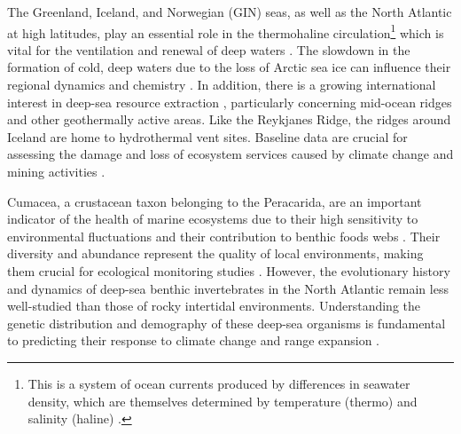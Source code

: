 The Greenland, Iceland, and Norwegian (GIN) seas, as well as the North Atlantic at high latitudes, play an essential role in the {thermohaline circulation}\footnote{This is a system of ocean currents produced by differences in seawater density, which are themselves determined by temperature (thermo) and salinity (haline) \citep{talley2013closure}.} which is vital for the ventilation and renewal of deep waters \citep{johannessen_relationship_1994}. The slowdown in the formation of cold, deep waters due to the loss of Arctic sea ice can influence their regional dynamics and chemistry \citep{meisner_prefacebiodiversity_2018}. In addition, there is a growing international interest in deep-sea resource extraction \citep{mengerink_call_2014}, particularly concerning mid-ocean ridges and other geothermally active areas. Like the Reykjanes Ridge, the ridges around Iceland are home to hydrothermal vent sites. Baseline data are crucial for assessing the damage and loss of ecosystem services caused by climate change and mining activities \citep{meisner_prefacebiodiversity_2018}. 

Cumacea, a crustacean taxon belonging to the Peracarida, are an important indicator of the health of marine ecosystems due to their high sensitivity to environmental fluctuations \citep{stransky_diversity_2010} and their contribution to benthic foods webs \citep{rehm2009cumacea}. Their diversity and abundance represent the quality of local environments, making them crucial for ecological monitoring studies \citep{hessler1967faunal}. However, the evolutionary history and dynamics of deep-sea benthic invertebrates in the North Atlantic remain less well-studied than those of rocky intertidal environments. Understanding the genetic distribution and demography of these deep-sea organisms is fundamental to predicting their response to climate change and range expansion \citep{jennings_phylogeographic_2014}.   

